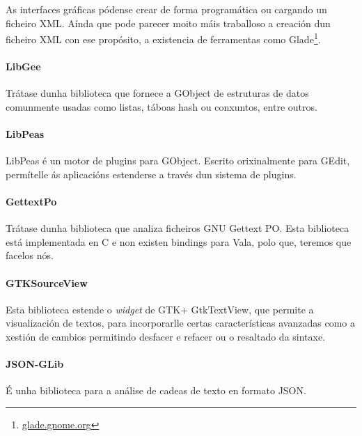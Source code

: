 As interfaces gráficas pódense crear de forma programática ou cargando un ficheiro XML. Aínda que pode parecer moito máis traballoso a creación dun ficheiro XML con ese propósito, a existencia de ferramentas como Glade\footnote{\href{http://glade.gnome.org}{glade.gnome.org}}.

\paragraph{LibGee} Trátase dunha biblioteca que fornece a GObject de estruturas de datos comunmente usadas como listas, táboas hash ou conxuntos, entre outros.

\paragraph{LibPeas} LibPeas é un motor de plugins para GObject. Escrito orixinalmente para GEdit, permítelle ás aplicacións estenderse a través dun sistema de plugins.

\paragraph{GettextPo} Trátase dunha biblioteca que analiza ficheiros GNU Gettext PO. Esta biblioteca está implementada en C e non existen bindings para Vala, polo que, teremos que facelos nós.

\paragraph{GTKSourceView} Esta biblioteca estende o \emph{widget} de GTK+ GtkTextView, que permite a visualización de textos, para incorporarlle certas características avanzadas como a xestión de cambios permitindo desfacer e refacer ou o resaltado da sintaxe.

\paragraph{JSON-GLib} É unha biblioteca para a análise de cadeas de texto en formato JSON.
